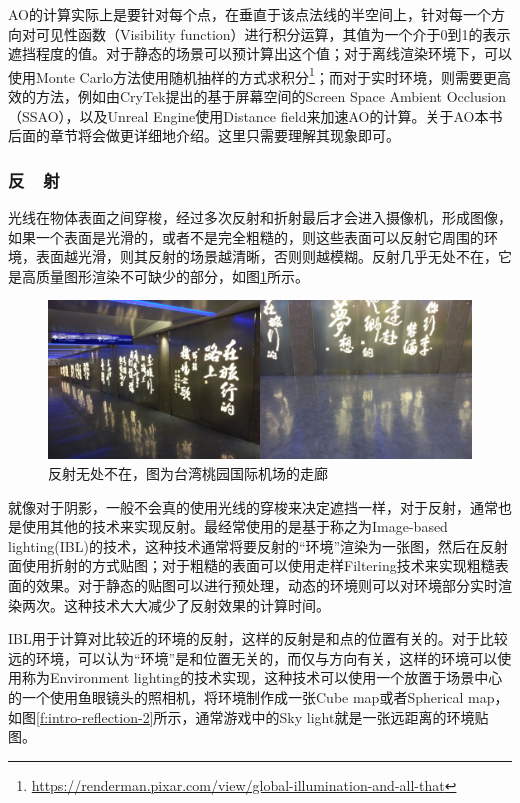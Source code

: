 AO的计算实际上是要针对每个点，在垂直于该点法线的半空间上，针对每一个方向对可见性函数（Visibility function）进行积分运算，其值为一个介于0到1的表示遮挡程度的值。对于静态的场景可以预计算出这个值；对于离线渲染环境下，可以使用Monte Carlo方法使用随机抽样的方式求积分\footnote{\url{https://renderman.pixar.com/view/global-illumination-and-all-that}}；而对于实时环境，则需要更高效的方法，例如由CryTek提出的基于屏幕空间的Screen Space Ambient Occlusion（SSAO），以及Unreal Engine使用Distance field来加速AO的计算。关于AO本书后面的章节将会做更详细地介绍。这里只需要理解其现象即可。




\subsubsection{反~~射}
光线在物体表面之间穿梭，经过多次反射和折射最后才会进入摄像机，形成图像，如果一个表面是光滑的，或者不是完全粗糙的，则这些表面可以反射它周围的环境，表面越光滑，则其反射的场景越清晰，否则则越模糊。反射几乎无处不在，它是高质量图形渲染不可缺少的部分，如图\ref{f:intro-reflection-1}所示。

\begin{figure}
\includegraphics[width=1.\textwidth]{figures/intro/reflection}	
\caption{反射无处不在，图为台湾桃园国际机场的走廊}
\label{f:intro-reflection-1}
\end{figure}

就像对于阴影，一般不会真的使用光线的穿梭来决定遮挡一样，对于反射，通常也是使用其他的技术来实现反射。最经常使用的是基于称之为Image-based lighting(IBL)的技术，这种技术通常将要反射的“环境”渲染为一张图，然后在反射面使用折射的方式贴图；对于粗糙的表面可以使用走样Filtering技术来实现粗糙表面的效果。对于静态的贴图可以进行预处理，动态的环境则可以对环境部分实时渲染两次。这种技术大大减少了反射效果的计算时间。

IBL用于计算对比较近的环境的反射，这样的反射是和点的位置有关的。对于比较远的环境，可以认为“环境”是和位置无关的，而仅与方向有关，这样的环境可以使用称为Environment lighting的技术实现，这种技术可以使用一个放置于场景中心的一个使用鱼眼镜头的照相机，将环境制作成一张Cube map或者Spherical map，如图\ref{f:intro-reflection-2}所示，通常游戏中的Sky light就是一张远距离的环境贴图。

